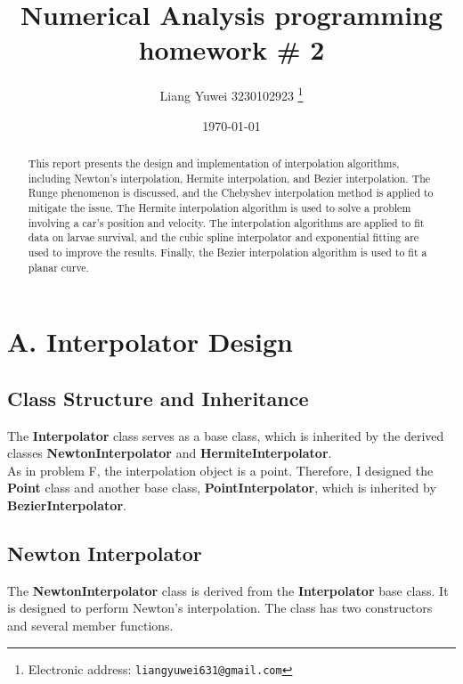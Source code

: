 \documentclass[a4paper]{article}
\begin{document}
\title{Numerical Analysis  programming homework \# 2}

\author{Liang Yuwei 3230102923
  \thanks{Electronic address: \texttt{liangyuwei631@gmail.com}}}


\date{\today}

\maketitle

\begin{abstract}
  This report presents the design and implementation of interpolation algorithms, including Newton's interpolation, Hermite interpolation, and Bezier interpolation. The Runge phenomenon is discussed, and the Chebyshev interpolation method is applied to mitigate the issue. The Hermite interpolation algorithm is used to solve a problem involving a car's position and velocity. The interpolation algorithms are applied to fit data on larvae survival, and the cubic spline interpolator and exponential fitting are used to improve the results. Finally, the Bezier interpolation algorithm is used to fit a planar curve.
\end{abstract}

\section{A. Interpolator Design}

\subsection{Class Structure and Inheritance}
The \textbf{Interpolator} class serves as a base class, which is inherited by the derived classes \textbf{NewtonInterpolator} and \textbf{HermiteInterpolator}.\\
As in problem F, the interpolation object is a point. Therefore, I designed the \textbf{Point} class and another base class, \textbf{PointInterpolator}, which is inherited by \textbf{BezierInterpolator}.

\subsection{Newton Interpolator}
The \textbf{NewtonInterpolator} class is derived from the \textbf{Interpolator} base class. It is designed to perform Newton's interpolation. The class has two constructors and several member functions.
\end{document}
